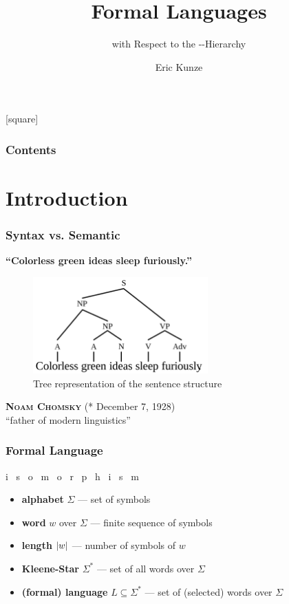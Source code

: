 \documentclass{beamer}
\title{Formal Languages}
\subtitle{with Respect to the \person{Chomsky}-\person{Schützenberger}-Hierarchy}
\author{Eric Kunze}
\newcommand{\person}[1]{\textsc{#1}}
\DeclareMathOperator{\lat}{lat}
\begin{document}
	
	
	\maketitle
	
	[square]
	
	\begin{frame} \frametitle{Contents}
		\bfseries
		\tableofcontents
	\end{frame}
	
	
	\section{Introduction}
	
	\begin{frame} \frametitle{Syntax vs. Semantic}
		\textbf{\enquote{Colorless green ideas sleep furiously.}}
		
		\pause
		
		\begin{figure}
			\includegraphics[height=10em]{fl_ex1.png}
			\caption{Tree representation of the sentence structure \cite{chomskySyntax}}
		\end{figure}
	
		\pause
	
		\person{\textbf{Noam Chomsky}} (* December 7, 1928) \\
		\enquote{father of modern linguistics}
	\end{frame}


	\begin{frame} \frametitle{Formal Language}
		\Large
		\alert<3>{ i \ s \ \alert<2>{o} \ m \ o \ r \ p \ h \ i \ s \ m }    \onslide<5-6>{$\Sigma_{\lat}^\ast$} \\
		
		\normalsize
		\begin{itemize}
			\item<2-> \textbf{alphabet} $\Sigma$ --- set of symbols
			\item<3-> \textbf{word} $w$ over $\Sigma$ --- finite sequence of symbols
			\item<4-> \textbf{length} $\left| w \right|$ --- number of symbols of $w$
			\item<5-> \textbf{Kleene-Star} $\Sigma^\ast$ --- set of all words over $\Sigma$
			\item<6-> \textbf{(formal) language} $L \subseteq \Sigma^\ast$ --- set of (selected) words over $\Sigma$
		\end{itemize}
	\end{frame}
\end{document}
